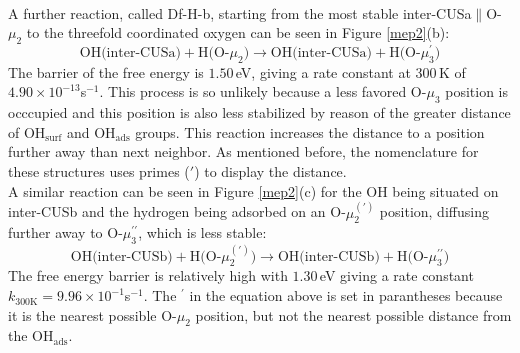 \documentclass[11pt,DIV=13,BCOR=5mm,a4paper,headinclude]{scrbook}
\begin{document}
\\
A further reaction, called Df-H-b, starting from the most stable inter-CUSa$\parallel$O-$\mu_2$ to the threefold coordinated oxygen can be seen in Figure \ref{mep2}(b):
\begin{equation}
 \text{OH(inter-CUSa)} + \text{H(O-$\mu_2$)} \rightarrow \text{OH(inter-CUSa)} + \text{H(O-$\mu_3^\prime$)} \tag{Df-H-b}
     \label{diffHb}
\end{equation}
The barrier of the free energy is $1.50\,$eV, giving a rate constant at $300\,$K of $4.90\times 10^{-13}$s$^{-1}$.
This process is so unlikely because a less favored O-$\mu_3$ position is occcupied and this position is also less stabilized by reason of the greater distance of OH$_{\text{surf}}$ and OH$_{\text{ads}}$ groups.
This reaction increases the distance to a position further away than next neighbor.
As mentioned before, the nomenclature for these structures uses primes ($\prime$) to display the distance.
\\
A similar reaction can be seen in Figure \ref{mep2}(c) for the OH being situated on inter-CUSb and the hydrogen being adsorbed on an O-$\mu_2^{(\prime)}$ position, diffusing further away to O-$\mu_3^{\prime\prime}$, which is less stable:
\begin{equation}
 \text{OH(inter-CUSb)} + \text{H(O-$\mu_2^{(\prime)}$)} \rightarrow \text{OH(inter-CUSb)} + \text{H(O-$\mu_3^{\prime\prime}$)} \tag{Df-H-c}
     \label{diffHc}
\end{equation}
The free energy barrier is relatively high with $1.30\,$eV giving a rate constant $k_\textrm{300K}=9.96\times 10^{-1}$s$^{-1}$.
The $^\prime$ in the equation above is set in parantheses because it is the nearest possible O-$\mu_2$ position, but not the nearest possible distance from the OH$_\textrm{ads}$.
\end{document}

